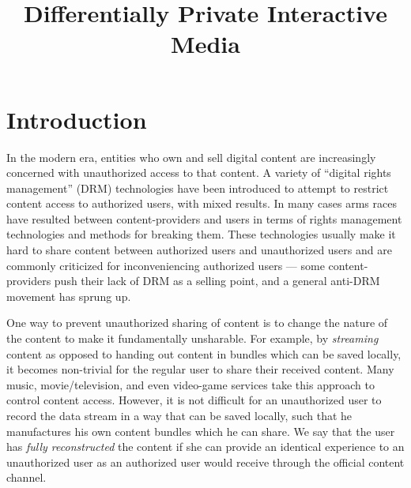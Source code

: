 \documentclass[preprint2]{aastex}
\begin{document}
\title{Differentially Private Interactive Media}

\author{} 
\vspace{0.2cm}



\section{Introduction}

In the modern era, entities who own and sell digital content are increasingly concerned with unauthorized access to that content. A variety of ``digital rights management'' (DRM) technologies have been introduced to attempt to restrict content access to authorized users, with mixed results. In many cases arms races have resulted between content-providers and users in terms of rights management technologies and methods for breaking them. These technologies usually make it hard to share content between authorized users and unauthorized users and are commonly criticized for inconveniencing authorized users --- some content-providers push their lack of DRM as a selling point, and a general anti-DRM movement has sprung up.

One way to prevent unauthorized sharing of content is to change the nature of the content to make it fundamentally unsharable. For example, by \emph{streaming} content as opposed to handing out content in bundles which can be saved locally, it becomes non-trivial for the regular user to share their received content. Many music, movie/television, and even video-game services take this approach to control content access. However, it is not difficult for an unauthorized user to record the data stream in a way that can be saved locally, such that he manufactures his own content bundles which he can share. We say that the user has \emph{fully reconstructed} the content if she can provide an identical experience to an unauthorized user as an authorized user would receive through the official content channel.
\end{document}
